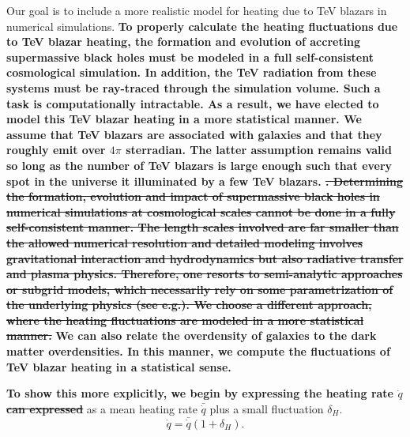 \documentclass[twocolumns]{emulateapj}
\newcommand\ALc[1]{{\color{red} \bf #1}} %
\newcommand\Pc[1]{{\color{cyan} \bf #1}} %
\begin{document}
Our goal is to include a more realistic model for heating due to TeV blazars in numerical simulations. \Pc{To properly calculate the heating fluctuations due to TeV blazar heating, the formation and evolution of accreting supermassive black holes must be modeled in a full self-consistent cosmological simulation.  In addition, the TeV radiation from these systems must be ray-traced through the simulation volume.  Such a task is computationally intractable.  As a result, we have elected to model this TeV blazar heating in a more statistical manner.  We assume that TeV blazars are associated with galaxies and that they roughly emit over $4\pi$ sterradian.  The latter assumption remains valid so long as the number of TeV blazars is large enough such that every spot in the universe it illuminated by a few TeV blazars.  \sout{. Determining the formation, evolution and impact of supermassive black holes in numerical simulations at cosmological scales cannot be done in a fully self-consistent manner. The length scales involved are far smaller than the allowed numerical resolution and detailed modeling involves gravitational interaction and hydrodynamics but also radiative transfer and plasma physics. Therefore, one resorts to semi-analytic approaches or subgrid models, which necessarily rely on some parametrization of the underlying physics (see e.g.\citet{2007MNRAS.380..877S}). 
We choose a different approach, where the heating fluctuations are modeled \ALc{in} a more statistical manner.} } \Pc{We can also relate the overdensity of galaxies to the dark matter overdensities.  In this manner, we compute the fluctuations of TeV blazar heating in a statistical sense.}  

\Pc{To show this more explicitly, we begin by expressing the heating rate $\dot{q}$ \sout{can expressed}} as a mean heating rate $\bar{\dot{q}}$ plus a small fluctuation $\delta_H$.
\begin{equation}
  \label{eq:delta_h}
  \dot{q}=\bar{\dot{q}}(1+\delta_H).
\end{equation}
\end{document}
